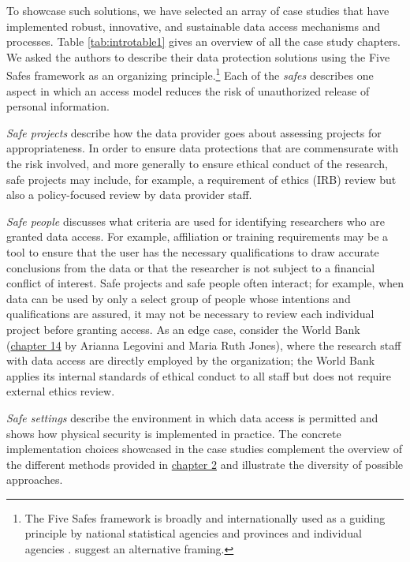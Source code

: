 To showcase such solutions, we have selected an array of case studies that have implemented robust, innovative, and sustainable data access mechanisms and processes. Table \ref{tab:introtable1} gives an overview of all the case study chapters. We asked the authors to describe their data protection solutions using the Five Safes framework \citep{desai2016} as an organizing principle.\footnote{The Five Safes framework is broadly and internationally used as a guiding principle by national statistical agencies \citep{australianbureauofstatistics2017, statisticscanada2018} and provinces and individual agencies \citep[see e.g., Province of British Columbia,][]{bcministryofcitizensservices}. \citet{altman2015} suggest an alternative framing.} Each of the \emph{safes} describes one aspect in which an access model reduces the risk of unauthorized release of personal information.



\emph{Safe projects} describe how the data provider goes about assessing projects for appropriateness. In order to ensure data protections that are commensurate with the risk involved, and more generally to ensure ethical conduct of the research, safe projects may include, for example, a requirement of ethics (IRB) review but also a policy-focused review by data provider staff.

\emph{Safe people} discusses what criteria are used for identifying researchers who are granted data access. For example, affiliation or training requirements may be a tool to ensure that the user has the necessary qualifications to draw accurate conclusions from the data or that the researcher is not subject to a financial conflict of interest. Safe projects and safe people often interact; for example, when data can be used by only a select group of people whose intentions and qualifications are assured, it may not be necessary to review each individual project before granting access. As an edge case, consider the World Bank (\protect\hyperlink{dime}{chapter 14} by Arianna Legovini and Maria Ruth Jones), where the research staff with data access are directly employed by the organization; the World Bank applies its internal standards of ethical conduct to all staff but does not require external ethics review.

\emph{Safe settings} describe the environment in which data access is permitted and shows how physical security is implemented in practice. The concrete implementation choices showcased in the case studies complement the overview of the different methods provided in \protect\hyperlink{security}{chapter 2} and illustrate the diversity of possible approaches.

